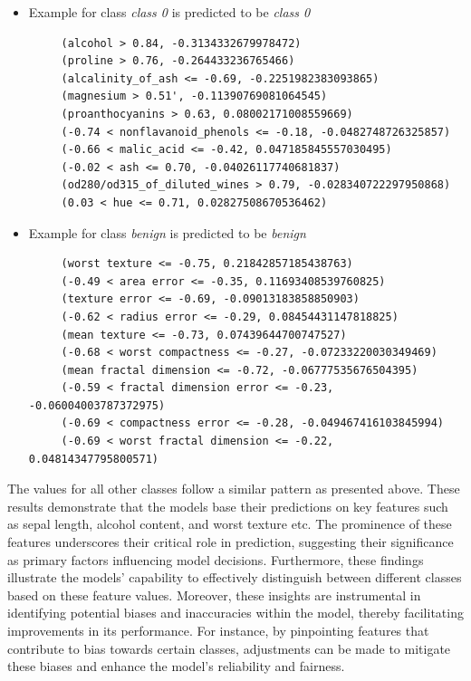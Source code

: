 \documentclass[journal, a4paper]{IEEEtran}
\begin{document}
\begin{itemize}
    \item Example for class \textit{class 0} is predicted to be \textit{class 0} \\
    {\tiny
    \begin{verbatim}
     (alcohol > 0.84, -0.3134332679978472)
     (proline > 0.76, -0.264433236765466)
     (alcalinity_of_ash <= -0.69, -0.2251982383093865)
     (magnesium > 0.51', -0.11390769081064545)
     (proanthocyanins > 0.63, 0.08002171008559669)
     (-0.74 < nonflavanoid_phenols <= -0.18, -0.0482748726325857)
     (-0.66 < malic_acid <= -0.42, 0.047185845557030495)
     (-0.02 < ash <= 0.70, -0.04026117740681837)
     (od280/od315_of_diluted_wines > 0.79, -0.028340722297950868)
     (0.03 < hue <= 0.71, 0.02827508670536462)
    \end{verbatim}
    }
\end{itemize}

\begin{itemize}
    \item Example for class \textit{benign} is predicted to be \textit{benign} \\
    {\tiny
    \begin{verbatim}
     (worst texture <= -0.75, 0.21842857185438763)
     (-0.49 < area error <= -0.35, 0.11693408539760825)
     (texture error <= -0.69, -0.09013183858850903)
     (-0.62 < radius error <= -0.29, 0.08454431147818825)
     (mean texture <= -0.73, 0.07439644700747527)
     (-0.68 < worst compactness <= -0.27, -0.07233220030349469)
     (mean fractal dimension <= -0.72, -0.06777535676504395)
     (-0.59 < fractal dimension error <= -0.23, -0.06004003787372975)
     (-0.69 < compactness error <= -0.28, -0.049467416103845994)
     (-0.69 < worst fractal dimension <= -0.22, 0.04814347795800571)
    \end{verbatim}
    }
\end{itemize}

The values for all other classes follow a similar pattern as presented above.
These results demonstrate that the models base their predictions on key features such as sepal length, alcohol content, and worst texture etc.
The prominence of these features underscores their critical role in prediction, suggesting their significance as primary factors influencing model decisions.
Furthermore, these findings illustrate the models' capability to effectively distinguish between different classes based on these feature values.
Moreover, these insights are instrumental in identifying potential biases and inaccuracies within the model, thereby facilitating improvements in its performance.
For instance, by pinpointing features that contribute to bias towards certain classes, adjustments can be made to mitigate these biases and enhance the model's reliability and fairness.
\end{document}
